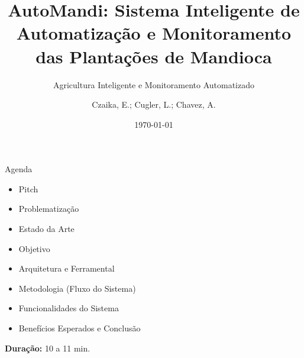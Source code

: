 \documentclass[aspectratio=169]{beamer}
\title[AutoMandi]{AutoMandi: Sistema Inteligente de Automatização e Monitoramento das Plantações de Mandioca}
\subtitle{Agricultura Inteligente e Monitoramento Automatizado}
\author[DSM1]{Czaika, E.; Cugler, L.; Chavez, A.}
\institute{Desenvolvimento de Software Multiplataforma\\FATEC Registro}
\date{\today}
\begin{document}
\begin{frame}
  \vspace{0.8cm}
  \begin{center}
    
    \vspace{0.4cm}
    
    {\normalsize\bfseries\inserttitle}\par
    
    \vspace{0.2cm}
    
    {\tiny\insertauthor}\par
    
    \vspace{0.1cm}
    
    {\small\textcolor{azulComplementar}{\insertsubtitle}}\par
    
    \vspace{0.5cm}
    
    
    \vspace{0.3cm}
    
    {\scriptsize\insertinstitute}\par
    
    \vspace{0.01cm}
    
    {\tiny\textcolor{azulComplementar}{\insertdate}}\par
  \end{center}
\end{frame}

\begin{frame}[b]{Agenda}
  \begin{itemize}
    \item Pitch
    \item Problematização
    \item Estado da Arte
    \item Objetivo
    \item Arquitetura e Ferramental
    \item Metodologia (Fluxo do Sistema)
    \item Funcionalidades do Sistema
    \item Benefícios Esperados e Conclusão
  \end{itemize}
  
  \vfill
  
  \hfill{\scriptsize \textbf{Duração:} 10 a 11 min.}
\end{frame}
\end{document}
